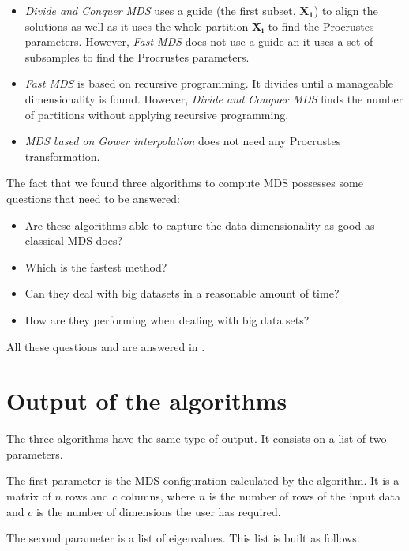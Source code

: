 \documentclass[11pt]{report}
\begin{document}
\begin{itemize}
\item \textit{Divide and Conquer MDS} uses a guide 
(the first subset, $\mathbf{X_1}$) to align the solutions as well as it uses the whole partition $\mathbf{X_i}$ to find the Procrustes parameters. However, 
\textit{Fast MDS} does not use a guide an it uses a set of subsamples to 
find the Procrustes parameters.

\item \textit{Fast MDS} is based on recursive programming. It divides until 
a manageable dimensionality is found. However, \textit{Divide and Conquer MDS} 
finds the number of partitions without applying recursive programming.

\item \textit{MDS based on Gower interpolation} does not need any Procrustes
transformation. 

\end{itemize}

The fact that we found three algorithms to compute MDS possesses some questions 
that need to be answered:

\begin{itemize}
\item Are these algorithms able to capture the data dimensionality as good as 
classical MDS does?
\item Which is the fastest method?
\item Can they deal with big datasets in a reasonable amount of time?
\item How are they performing when dealing with big data sets?
\end{itemize}

All these questions and are answered in .

\section{Output of the algorithms}
The three algorithms have the same type of output. It consists on a list of 
two parameters. 

\indent The first parameter is the MDS configuration calculated by the 
algorithm. It is a matrix of $n$ rows and $c$ columns, where $n$ is the number 
of rows of the input data and $c$ is the number of dimensions the user has 
required.

\indent The second parameter is a list of eigenvalues. This list is built
as follows: 
\end{document}

